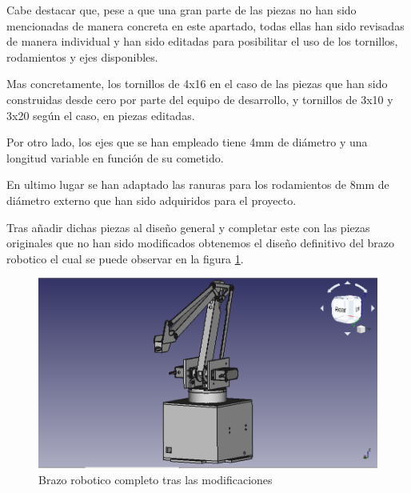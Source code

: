 Cabe destacar que, pese a que una gran parte de las piezas no han sido mencionadas de manera concreta en este apartado, todas ellas han sido revisadas de manera individual y han sido editadas para posibilitar el uso de los tornillos, rodamientos y ejes disponibles.

Mas concretamente, los tornillos de 4x16 en el caso de las piezas que han sido construidas desde cero por parte del equipo de desarrollo, y tornillos de 3x10 y 3x20 según el caso, en piezas editadas.

Por otro lado, los ejes que se han empleado tiene 4mm de diámetro y una longitud variable en función de su cometido.

En ultimo lugar se han adaptado las ranuras para los rodamientos de 8mm de diámetro externo que han sido adquiridos para el proyecto.

Tras añadir dichas piezas al diseño general y completar este con las piezas originales que no han sido modificados obtenemos el diseño definitivo del brazo robotico el cual se puede observar en la figura \ref{fig:brazo_completo_modificado}.

\begin{figure}[H]
    \centering
    \includegraphics[width=.9\linewidth]{pictures/BrazoEntero.png}
    \caption{Brazo robotico completo tras las modificaciones}
    \label{fig:brazo_completo_modificado}
\end{figure}